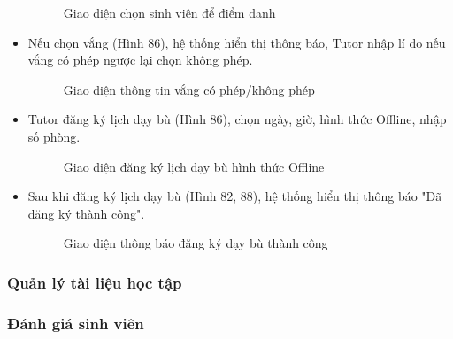 \begin{itemize}
    \begin{figure}[H]
    \centering
    \setlength{\fboxsep}{2pt}     
    \setlength{\fboxrule}{0.5pt}   
    \caption{Giao diện chọn sinh viên để điểm danh}
    \end{figure}
    \item Nếu chọn vắng (Hình 86), hệ thống hiển thị thông báo, Tutor nhập lí do nếu vắng có phép ngược lại chọn không phép.
    \begin{figure}[H]
    \centering
    \setlength{\fboxsep}{2pt}     
    \setlength{\fboxrule}{0.5pt}   
    \caption{Giao diện thông tin vắng có phép/không phép}
    \end{figure}
    \item Tutor đăng ký lịch dạy bù (Hình 86), chọn ngày, giờ, hình thức Offline, nhập số phòng. 
    \begin{figure}[H]
    \centering
    \setlength{\fboxsep}{2pt}     
    \setlength{\fboxrule}{0.5pt}   
    \caption{Giao diện đăng ký lịch dạy bù hình thức Offline}
    \end{figure}
    \item Sau khi đăng ký lịch dạy bù (Hình 82, 88), hệ thống hiển thị thông báo "Đã đăng ký thành công".
    \begin{figure}[H]
    \centering
    \setlength{\fboxsep}{2pt}     
    \setlength{\fboxrule}{0.5pt}   
    \caption{Giao diện thông báo đăng ký dạy bù thành công}
    \end{figure}
\end{itemize}
\subsubsection*{Quản lý tài liệu học tập}

\subsubsection*{Đánh giá sinh viên}